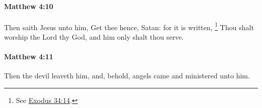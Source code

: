		\paragraph{Matthew 4:10} %
			\label{MATTHEW-4-10}

			Then saith Jesus unto him, Get thee hence, Satan: for it is written,%
				\footnote{%
					See \hyperref[EXODUS-34-14]{Exodus 34:14}.
					}
			Thou shalt worship the Lord thy God, and him only shalt thou serve.

			\begin{framed}
			\scriptsize
				\begin{compactdesc}
					\item[SBLG] 
				\end{compactdesc}
			\end{framed}

		\paragraph{Matthew 4:11} %
			\label{MATTHEW-4-11}

			Then the devil leaveth him, and, behold, angels came and ministered unto him.

